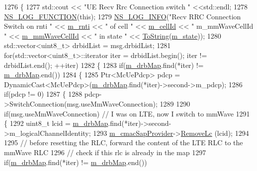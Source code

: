 \begin{DoxyCode}
1276 \{
1277         std::cout << \textcolor{stringliteral}{"UE Recv Rrc Connection switch "} <<std::endl;
1278  \hyperlink{log-macros-disabled_8h_a90b90d5bad1f39cb1b64923ea94c0761}{NS\_LOG\_FUNCTION}(\textcolor{keyword}{this});
1279         \hyperlink{group__logging_gafbd73ee2cf9f26b319f49086d8e860fb}{NS\_LOG\_INFO}(\textcolor{stringliteral}{"Recv RRC Connection Switch on rnti "} << \hyperlink{classns3_1_1LteUeRrc_a8e078d8ef0ad23e670fe2ef08caab84f}{m\_rnti} << \textcolor{stringliteral}{" of cell "} << 
      \hyperlink{classns3_1_1LteUeRrc_aa9d3317734eea9158371d9fccf3a0c48}{m\_cellId} << \textcolor{stringliteral}{" m\_mmWaveCellId "} << \hyperlink{classns3_1_1LteUeRrc_a28b83564a465159f0cf6d75d4b48d7eb}{m\_mmWaveCellId} << \textcolor{stringliteral}{" in state "} << 
      \hyperlink{namespacens3_a3d1f7e1bec1972e2ae8d64673fcfcd9c}{ToString}(\hyperlink{classns3_1_1LteUeRrc_a81d711739d758a5add38b100086be632}{m\_state}));
1280   std::vector<uint8\_t> drbidList = msg.drbidList;
1281   \textcolor{keywordflow}{for}(std::vector<uint8\_t>::iterator iter = drbidList.begin(); iter != drbidList.end(); ++iter)
1282   \{
1283     \textcolor{keywordflow}{if}(\hyperlink{classns3_1_1LteUeRrc_aa85c5bdde73c2072b2b3053e629bdce0}{m\_drbMap}.find(*iter) != \hyperlink{classns3_1_1LteUeRrc_aa85c5bdde73c2072b2b3053e629bdce0}{m\_drbMap}.end())
1284     \{
1285       Ptr<McUePdcp> pdcp = DynamicCast<McUePdcp>(\hyperlink{classns3_1_1LteUeRrc_aa85c5bdde73c2072b2b3053e629bdce0}{m\_drbMap}.find(*iter)->second->m\_pdcp);
1286       \textcolor{keywordflow}{if}(pdcp != 0)
1287       \{
1288         pdcp->SwitchConnection(msg.useMmWaveConnection);
1289 
1290         \textcolor{keywordflow}{if}(msg.useMmWaveConnection) \textcolor{comment}{// I was on LTE, now I switch to mmWave}
1291         \{
1292           uint8\_t lcid = \hyperlink{classns3_1_1LteUeRrc_aa85c5bdde73c2072b2b3053e629bdce0}{m\_drbMap}.find(*iter)->second->m\_logicalChannelIdentity;
1293           \hyperlink{classns3_1_1LteUeRrc_a5a7bffd2040d73eb5db1aaef849d0396}{m\_cmacSapProvider}->\hyperlink{classns3_1_1LteUeCmacSapProvider_a4d1b9e67debe6acb4558dcff8788349c}{RemoveLc} (lcid);
1294 
1295           \textcolor{comment}{// before resetting the RLC, forward the content of the LTE RLC to the mmWave RLC}
1296           \textcolor{comment}{// check if this rlc is already in the map}
1297           \textcolor{keywordflow}{if}(\hyperlink{classns3_1_1LteUeRrc_aa85c5bdde73c2072b2b3053e629bdce0}{m\_drbMap}.find(*iter) != \hyperlink{classns3_1_1LteUeRrc_aa85c5bdde73c2072b2b3053e629bdce0}{m\_drbMap}.end())

\end{DoxyCode}
